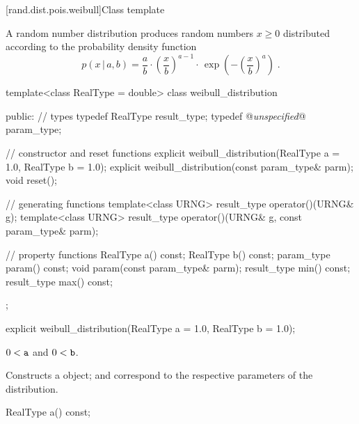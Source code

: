 
[rand.dist.pois.weibull]{Class template }%

\pnum
A  random number distribution
produces random numbers $x \geq 0$
distributed according to
the probability density function%
%
\[%
 p(x\,|\,a,b)
      =       \frac{a}{b}
        \cdot \left(\frac{x}{b}\right)^{a-1}
        \cdot \, \exp\left( -\left(\frac{x}{b}\right)^a\right)
\; \mbox{.}
\]

\begin{codeblock}
template<class RealType = double>
 class weibull_distribution
{
public:
 // types
 typedef RealType result_type;
 typedef @\textit{unspecified}@ param_type;

 // constructor and reset functions
 explicit weibull_distribution(RealType a = 1.0, RealType b = 1.0);
 explicit weibull_distribution(const param_type& parm);
 void reset();

 // generating functions
 template<class URNG>
   result_type operator()(URNG& g);
 template<class URNG>
   result_type operator()(URNG& g, const param_type& parm);

 // property functions
 RealType a() const;
 RealType b() const;
 param_type param() const;
 void param(const param_type& parm);
 result_type min() const;
 result_type max() const;
};
\end{codeblock}

%
\begin{itemdecl}
explicit weibull_distribution(RealType a = 1.0, RealType b = 1.0);
\end{itemdecl}%

\begin{itemdescr}
\pnum\requires
 $ 0 < \texttt{a} $ and  $ 0 < \texttt{b} $.

\pnum\effects Constructs a  object;
  and 
 correspond to the respective parameters of the distribution.
\end{itemdescr}

%
%
\begin{itemdecl}
RealType a() const;
\end{itemdecl}

